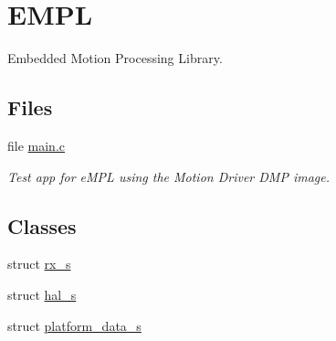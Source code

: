 \hypertarget{group__e_m_p_l}{}\section{E\+M\+P\+L}
\label{group__e_m_p_l}


Embedded Motion Processing Library.  


\subsection*{Files}
\begin{DoxyCompactItemize}
\item 
file \hyperlink{main_8c}{main.\+c}
\begin{DoxyCompactList}\small\item\em Test app for e\+M\+P\+L using the Motion Driver D\+M\+P image. \end{DoxyCompactList}\end{DoxyCompactItemize}
\subsection*{Classes}
\begin{DoxyCompactItemize}
\item 
struct \hyperlink{structrx__s}{rx\+\_\+s}
\item 
struct \hyperlink{structhal__s}{hal\+\_\+s}
\item 
struct \hyperlink{structplatform__data__s}{platform\+\_\+data\+\_\+s}
\end{DoxyCompactItemize}
